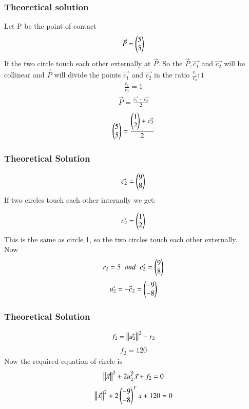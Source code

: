 \documentclass{beamer}
\begin{document}
    \begin{frame}
    \frametitle{Theoretical solution}
   Let P be the point of contact
\begin{align}
    \Vec{P}=\begin{pmatrix}5\\5\end{pmatrix}
\end{align}
If the two circle touch each other externally at $\Vec{P}$. So the $\Vec{P},\Vec{c_1}$ and $\Vec{c_2}$ will be collinear and $\Vec{P}$ will divide the points $\Vec{c_1}$ and $\Vec{c_2}$ in the ratio $\frac{r_1}{r_2}:1$
\begin{align}
   \frac{r_1}{r_2}=1
\end{align}
\begin{align}
   \Vec{P}=\frac{\Vec{c_1}+\Vec{c_2}}{2}
\end{align}
\begin{align}
    \begin{pmatrix}5\\5\end{pmatrix}=\frac{\begin{pmatrix}1\\2\end{pmatrix}+\Vec{c_2}}{2}
\end{align}

    \end{frame}
    
    \begin{frame}
    \frametitle{Theoretical Solution}
    \begin{align}
\Vec{c_2}=\begin{pmatrix}9\\8\end{pmatrix}
  \end{align}
If two circles touch each other internally we get:

\begin{align}
 \Vec{c_2}=\begin{pmatrix}1\\2\end{pmatrix}
\end{align}
This is the same as circle 1, so the two circles touch each other externally.\\
Now
\begin{align}
    r_2=5\;\;and\;\;\Vec{c_2}=\begin{pmatrix}9\\8\end{pmatrix}
\end{align}
\begin{align}
\Vec{u_2}=\Vec{-c_2}=\begin{pmatrix}-9\\-8\end{pmatrix}
\end{align}


    \end{frame}
    
    \begin{frame}
    \frametitle{Theoretical Solution}
   \begin{align}
    f_2=\left\lVert\Vec{u_2}\right\rVert^2-r_2
\end{align}
\begin{align}
   f_2=120
\end{align}
Now the required equation of circle is
\begin{align}
   \left\lVert\Vec{x}\right\rVert^2+2\Vec{u_2^T}\Vec{x}+f_2=0
\end{align}
\begin{align}
    \left\lVert\Vec{x}\right\rVert^2+2\begin{pmatrix}-9\\-8\end{pmatrix}^Tx+120=0
\end{align}
    \end{frame}
    
\end{document}
